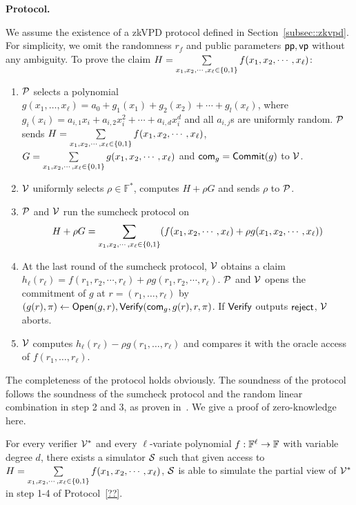 \medskip\noindent\textbf{Protocol.}

We assume the existence of a zkVPD protocol defined in Section~\ref{subsec::zkvpd}. For simplicity, we omit the randomness $r_f$ and public parameters $\pp,\vp$ without any ambiguity. To prove the claim $H = \sum\limits_{x_1, x_2, \cdots, x_\ell \in \binary} f(x_1, x_2, \cdots, x_\ell)$:
\begin{enumerate}

\item $\P$ selects a polynomial $g(x_1,\ldots, x_\ell) = a_{0} + g_1(x_1) + g_2(x_2) + \cdots + g_l(x_\ell)$, where $g_{i}(x_i) = a_{i,1}x_i + a_{i,2}x_i^2 + \cdots + a_{i,d}x_i^d$ and all $a_{i,j}$s are uniformly random. $\P$ sends $H = \sum\limits_{x_1, x_2, \cdots, x_\ell \in \binary} f(x_1, x_2, \cdots, x_\ell)$, $G = \sum\limits_{x_1, x_2, \cdots, x_\ell \in \binary} g(x_1, x_2, \cdots, x_\ell)$ and $\comm_g = \Commit(g)$ to $\V$.
\item $\V$ uniformly selects $\rho \in \mathbb{F}^*$, computes $H+\rho G$ and sends $\rho$ to $\P$.
\item $\P$ and $\V$ run the sumcheck protocol on
$$H + \rho G = \sum\limits_{x_1, x_2, \cdots, x_\ell \in \binary}(f(x_1, x_2, \cdots, x_\ell) + \rho g(x_1, x_2, \cdots, x_\ell))$$
\item At the last round of the sumcheck protocol, $\V$ obtains a claim $h_\ell(r_\ell) = f(r_1, r_2, \cdots, r_\ell)+\rho g(r_1, r_2, \cdots, r_\ell)$. $\P$ and $\V$ opens the commitment of $g$ at $r = (r_1,\ldots, r_\ell)$ by $(g(r), \pi)\leftarrow\Open(g,r), \Verify(\comm_g,g(r),r,\pi)$. If $\Verify$ outputs $\reject$, $\V$ aborts.
\item $\V$ computes $h_\ell(r_\ell)-\rho g(r_1,\ldots,r_\ell)$ and compares it with the oracle access of $f(r_1,\ldots, r_\ell)$.

\end{enumerate}

The completeness of the protocol holds obviously. The soundness of the protocol follows the soundness of the sumcheck protocol and the random linear combination in step 2 and 3, as proven in~\cite{zksumcheck}. We give a proof of zero-knowledge here.

\begin{theorem}\label{thm:zksc}
	For every verifier $\V^*$ and every $\ell$-variate polynomial $f:\F^\ell\rightarrow\F$ with variable degree $d$, there exists a simulator $\S$ such that given access to $H = \sum\limits_{x_1, x_2, \cdots, x_\ell \in \binary} f(x_1, x_2, \cdots, x_\ell)$, $\S$ is able to simulate the partial view of $\V^*$ in step 1-4 of Protocol~\ref{??}. 
\end{theorem}

